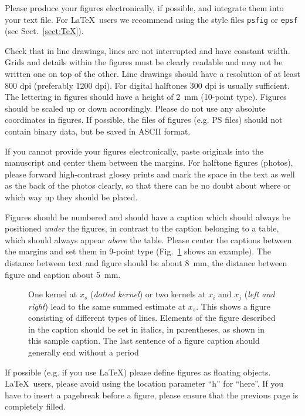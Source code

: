 \documentclass[runningheads]{llncs}
\begin{document}
Please produce your figures electronically, if possible,
and integrate them into your text file. For \LaTeX\ users
we recommend using the style files \verb+psfig+ or \verb+epsf+
(see Sect.~\ref{sect:TeX}).

Check that in line drawings, lines are not
interrupted and have constant width. Grids and details within the
figures must be clearly readable and may not be written one on top of
the other. Line drawings should have a resolution of at least 800 dpi
(preferably 1200 dpi).
For digital halftones 300 dpi is usually sufficient.
The lettering in figures should have a height of 2~mm (10-point type).
Figures should be scaled up or down accordingly.
Please do not use any absolute coordinates in figures.
If possible, the files of figures (e.g. PS files) should not contain
binary data, but be saved in ASCII format.

If you cannot provide your figures electronically,
paste originals into the manuscript and center them between the
margins. For halftone figures (photos), please forward high-contrast
glossy prints and mark the space in the text as well as the back of the
photos clearly, so that there can be no doubt about where or which
way up they should be placed.

Figures should be numbered and should have a caption which should
always be positioned {\it under} the figures, in contrast to the caption
belonging to a table, which should always appear {\it above} the table.
Please center the captions between the margins and set them in
9-point type
(Fig.~\ref{fig:example} shows an example).
The distance between text and figure should be about 8~mm, the
distance between figure and caption about 5~mm.
\begin{figure}
\caption{One kernel at $x_s$ ({\it dotted kernel}) or two kernels at
$x_i$ and $x_j$ ({\it left and right}) lead to the same summed estimate
at $x_s$. This shows a figure consisting of different types of
lines. Elements of the figure described in the caption should be set in
italics,
in parentheses, as shown in this sample caption. The last
sentence of a figure caption should generally end without a period}
\label{fig:example}
\end{figure}

If possible (e.g. if you use \LaTeX) please define figures as floating
objects. \LaTeX\ users, please avoid using the location
parameter ``h'' for ``here''. If you have to insert a pagebreak before a
figure, please ensure that the previous page is completely filled.
\end{document}
